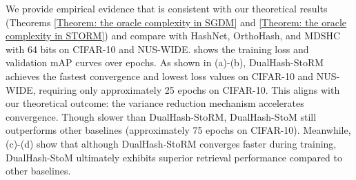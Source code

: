 We provide empirical evidence that is consistent with our theoretical results (Theorems \ref{Theorem: the oracle complexity in SGDM} and \ref{Theorem: the oracle complexity in STORM}) and compare with HashNet, OrthoHash, and MDSHC with 64 bits on CIFAR-10 and NUS-WIDE. 
 shows the training loss and validation mAP curves over epochs.
As shown in  (a)-(b), DualHash-StoRM achieves the fastest convergence and lowest loss values on CIFAR-10 and NUS-WIDE, requiring only approximately 25 epochs on CIFAR-10. This aligns with our theoretical outcome: the variance reduction mechanism accelerates convergence. Though slower than DualHash-StoRM, DualHash-StoM still outperforms other baselines (approximately 75 epochs on CIFAR-10). 
Meanwhile,  (c)-(d) show that although DualHash-StoRM converges faster during training, DualHash-StoM ultimately exhibits superior retrieval performance compared to other baselines. 
